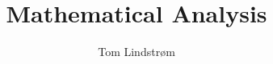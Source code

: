 \documentclass[a4paper]{memoir}
\title{Mathematical Analysis}
\author{Tom Lindstr{\o}m\hfill\the\year}
\begin{document}
    \mnfrontpage
\end{document}
